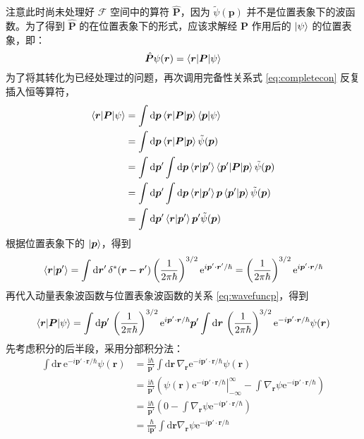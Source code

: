 \documentclass[cn,10pt,math=newtx,citestyle=gb7714-2015,bibstyle=gb7714-2015]{elegantbook}
\def\bm{\boldsymbol}
\def\mc{\mathcal}
\def\d{\mathrm d}
\def\e{\mathrm e}
\def\i{\mathrm i}
\def\td{\tilde}
\begin{document}
注意此时尚未处理好 $\mc F$ 空间中的算符 $\hat{\bm P}$，因为 $\td\psi(\bm p)$ 并不是位置表象下的波函数。为了得到 $\hat{\bm P}$ 的在位置表象下的形式，应该求解经 $\bm P$ 作用后的 $\ket{\psi}$ 的位置表象，即：
\begin{equation*}
\hat{\bm P}\psi(\bm r) = \braket{\bm r|\bm P|\psi}
\end{equation*}为了将其转化为已经处理过的问题，再次调用完备性关系式 \ref{eq:completecon} 反复插入恒等算符，
\begin{align*}
   \braket{\bm r|\bm P|\psi} &= \int\d\bm p\braket{\bm r|\bm P|\bm p}\braket{\bm p|\psi}\\
   &=\int\d\bm p\braket{\bm r|\bm P|\bm p}\td\psi(\bm p)\\
   &=\int\d\bm p'\int\d\bm p\braket{\bm r|\bm p'}\braket{\bm p'|\bm P|\bm p}\td\psi(\bm p)\\
   &=\int\d\bm p'\int\d\bm p\braket{\bm r|\bm p'}\bm p\braket{\bm p'|\bm p}\td\psi(\bm p)\\
   &=\int\d\bm p'\braket{\bm r|\bm p'}\bm p'\td\psi(\bm p)
\end{align*}
根据位置表象下的 $\ket{\bm p}$，得到
\begin{equation}
   \braket{\bm r|\bm p'}=\int\d\bm r'\,\delta^*(\bm r-\bm r')\left(\frac{1}{2\pi\hbar}\right)^{3/2}\e^{i\bm p'\cdot\bm r'/\hbar}=\left(\frac{1}{2\pi\hbar}\right)^{3/2}\e^{i\bm p'\cdot\bm r/\hbar}
\end{equation}
再代入动量表象波函数与位置表象波函数的关系 \ref{eq:wavefuncp}，得到
\begin{equation}
   \label{eq:momopwavfunc1}
   \braket{\bm r|\bm P|\psi}=\int\d\bm p'\,\left(\frac{1}{2\pi\hbar}\right)^{3/2}\e^{i\bm p'\cdot\bm r/\hbar}\bm p'\int\d\bm r\,\left(\frac{1}{2\pi\hbar}\right)^{3/2}\e^{-i\bm p'\cdot\bm r/\hbar}\psi(\bm r)
\end{equation}
先考虑积分的后半段，采用分部积分法：
\begin{align*}
   \int\d\bm r\,\e^{-i\bm p'\cdot\bm r/\hbar}\psi(\bm r) &= \frac{\i\hbar}{\bm p'}\int\d\bm r\,\nabla_{\bm r}\e^{-i\bm p'\cdot\bm r/\hbar}\psi(\bm r)\\
   &=\frac{\i\hbar}{\bm p'}\left(\left.\psi(\bm r)\e^{-i\bm p'\cdot\bm r/\hbar}\right|_{-\infty}^{\infty}-\int\nabla_{\bm r}\psi\e^{-i\bm p'\cdot\bm r/\hbar}\right)\\
   &=\frac{\i\hbar}{\bm p'}\left(0-\int\nabla_{\bm r}\psi\e^{-i\bm p'\cdot\bm r/\hbar}\right)\\ 
   &=\frac{\hbar}{\i\bm p'}\int\d\bm r\nabla_{\bm r}\psi\e^{-i\bm p'\cdot\bm r/\hbar}
\end{align*}
\end{document}
